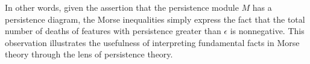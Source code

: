 In other words, given the assertion that the persistence module $M$ has a persistence diagram, the Morse inequalities simply express the fact that the total number of deaths of features with persistence greater than $\epsilon$ is nonnegative.
This observation illustrates the usefulness of interpreting fundamental facts in Morse theory through the lens of persistence theory.


